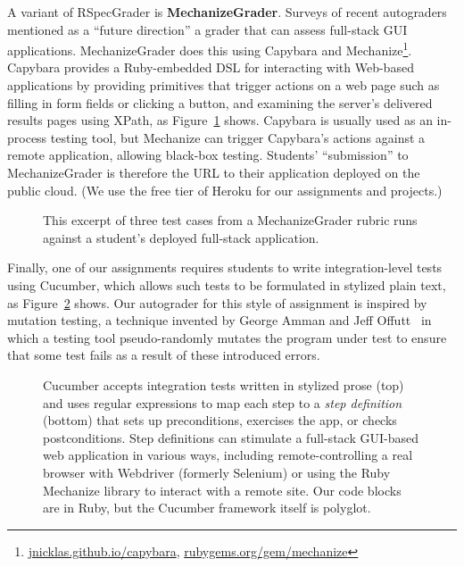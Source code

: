 A variant of RSpecGrader is \textbf{MechanizeGrader}.
Surveys of recent
autograders~\cite{ihantola-2010-autograding-survey,douce-2005-autograding-survey}
mentioned as a ``future direction'' a grader that can assess full-stack
GUI applications.
MechanizeGrader does this using Capybara and
Mechanize\footnote{\url{jnicklas.github.io/capybara},
\url{rubygems.org/gem/mechanize}}.
Capybara provides a Ruby-embedded DSL for interacting with Web-based
applications by providing primitives that trigger actions on a web page
such as filling in form fields or clicking a button, and examining the
server's delivered results pages using XPath, as
Figure~\ref{fig:mechanize_grader_example} shows. 
Capybara is usually used as an in-process testing tool, but Mechanize
can trigger Capybara's actions against a remote application, allowing
black-box testing.
Students' ``submission'' to MechanizeGrader is therefore the URL to their
application deployed on the public 
cloud.  (We use the free tier of Heroku for our assignments and
projects.)

\begin{figure}
 \centering
  
  \caption{\label{fig:mechanize_grader_example} 
This excerpt of three test cases from a MechanizeGrader rubric runs
against a student's 
deployed full-stack application.}
\end{figure}

Finally, one of our assignments requires students to write integration-level
tests using Cucumber, which allows such tests to be formulated in
stylized plain text, as Figure~\ref{fig:cucumber} shows.
Our autograder for this
style of assignment is inspired by mutation testing, a technique invented
by George Amman and Jeff 
Offutt~\cite{ammann-offutt-sw-testing} in which a
testing tool pseudo-randomly mutates the program under test to ensure
that some test fails as a result of these introduced errors.

\begin{figure}
  \centering
    
  \caption{\label{fig:cucumber} Cucumber accepts integration tests 
    written in stylized prose (top) and uses regular expressions to map each
    step to a \emph{step definition} (bottom) that sets up preconditions, exercises the app,
    or checks postconditions.  Step definitions 
    can stimulate a full-stack GUI-based web application in various
    ways, including remote-controlling a real browser with Webdriver
    (formerly Selenium) or using the Ruby Mechanize library to interact
    with a remote site.  Our code blocks are in Ruby, but the Cucumber framework
itself is polyglot.} 
\end{figure}

